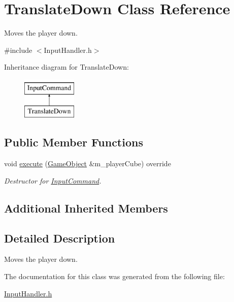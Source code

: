 \hypertarget{class_translate_down}{}\section{Translate\+Down Class Reference}
\label{class_translate_down}


Moves the player down.  




{\ttfamily \#include $<$Input\+Handler.\+h$>$}

Inheritance diagram for Translate\+Down\+:\begin{figure}[H]
\begin{center}
\leavevmode
\includegraphics[height=2.000000cm]{class_translate_down}
\end{center}
\end{figure}
\subsection*{Public Member Functions}
\begin{DoxyCompactItemize}
\item 
\mbox{\label{class_translate_down_a4786972ab7bed4c758c5afa56006b0e8}} 
void \mbox{\hyperlink{class_translate_down_a4786972ab7bed4c758c5afa56006b0e8}{execute}} (\mbox{\hyperlink{class_game_object}{Game\+Object}} \&m\+\_\+player\+Cube) override
\begin{DoxyCompactList}\small\item\em Destructor for \mbox{\hyperlink{class_input_command}{Input\+Command}}. \end{DoxyCompactList}\end{DoxyCompactItemize}
\subsection*{Additional Inherited Members}


\subsection{Detailed Description}
Moves the player down. 

The documentation for this class was generated from the following file\+:\begin{DoxyCompactItemize}
\item 
\mbox{\hyperlink{_input_handler_8h}{Input\+Handler.\+h}}\end{DoxyCompactItemize}
